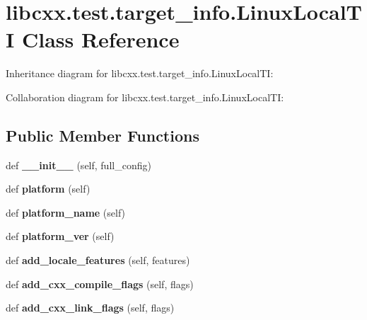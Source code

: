 \hypertarget{classlibcxx_1_1test_1_1target__info_1_1_linux_local_t_i}{}\section{libcxx.\+test.\+target\+\_\+info.\+Linux\+Local\+TI Class Reference}
\label{classlibcxx_1_1test_1_1target__info_1_1_linux_local_t_i}


Inheritance diagram for libcxx.\+test.\+target\+\_\+info.\+Linux\+Local\+TI\+:


Collaboration diagram for libcxx.\+test.\+target\+\_\+info.\+Linux\+Local\+TI\+:
\subsection*{Public Member Functions}
\begin{DoxyCompactItemize}
\item 
\mbox{\label{classlibcxx_1_1test_1_1target__info_1_1_linux_local_t_i_a5b02d5f2abf126ab5a5af913ce4f68c1}} 
def {\bfseries \+\_\+\+\_\+init\+\_\+\+\_\+} (self, full\+\_\+config)
\item 
\mbox{\label{classlibcxx_1_1test_1_1target__info_1_1_linux_local_t_i_ac0cf1e7a6684a25c1fc17c7f138888ff}} 
def {\bfseries platform} (self)
\item 
\mbox{\label{classlibcxx_1_1test_1_1target__info_1_1_linux_local_t_i_a08e5a76325dc771bb7f5548ab843a965}} 
def {\bfseries platform\+\_\+name} (self)
\item 
\mbox{\label{classlibcxx_1_1test_1_1target__info_1_1_linux_local_t_i_a15ab90063699503b5d4f83ad83f6fcc2}} 
def {\bfseries platform\+\_\+ver} (self)
\item 
\mbox{\label{classlibcxx_1_1test_1_1target__info_1_1_linux_local_t_i_a9af5d1881e99a7e3085d44ae62695b4c}} 
def {\bfseries add\+\_\+locale\+\_\+features} (self, features)
\item 
\mbox{\label{classlibcxx_1_1test_1_1target__info_1_1_linux_local_t_i_a12aa8cde31aac74342c4a74ad4267351}} 
def {\bfseries add\+\_\+cxx\+\_\+compile\+\_\+flags} (self, flags)
\item 
\mbox{\label{classlibcxx_1_1test_1_1target__info_1_1_linux_local_t_i_a052de78549ab2caf12cb9b3ce1f24541}} 
def {\bfseries add\+\_\+cxx\+\_\+link\+\_\+flags} (self, flags)
\end{DoxyCompactItemize}
